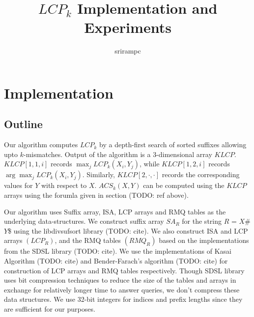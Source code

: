 \documentclass{article}
\author{srirampc}
\date{}
\title{$LCP_k$ Implementation and Experiments}
\begin{document}
\maketitle

\section{Implementation}
\subsection{Outline}

Our algorithm computes $LCP_k$ by a depth-first search of sorted
suffixes allowing upto $k$-mismatches. Output of the algorithm is a
3-dimensional array $KLCP$. $KLCP[1, 1, i]$ records $\max_{j} LCP_k(X_i,
Y_j)$, while $KLCP[1, 2, i]$ records $\arg \max_{j} LCP_k(X_i,
Y_j)$. Similarly, $KLCP[2, \cdot, \cdot]$ records the corresponding
values for $Y$ with respect to $X$.
$ACS_k(X,Y)$ can be computed using the $KLCP$ arrays using the forumla
given in section (TODO: ref above).

Our algorithm uses Suffix array, ISA, LCP arrays and RMQ tables as the
underlying data-structures. We construct suffix array $SA_R$ for the
string $R$ = $X$\#$Y$\$ using the libdivsufsort library (TODO: cite). We
also construct ISA and LCP arrays $(LCP_R)$, and the RMQ tables
$(RMQ_R)$ based on the implementations from the SDSL library (TODO:
cite). We use the implementations of Kasai Algorithm (TODO: cite) and
Bender-Farach's algorithm (TODO: cite) for construction of LCP arrays
and RMQ tables respectively. Though SDSL library uses bit compression
techniques to reduce the size of the tables and arrays in exchange for
relatively longer time to answer queries, we don't compress these data
structures. We use 32-bit integers for indices and prefix lengths since
they are sufficient for our purposes.


\end{document}
